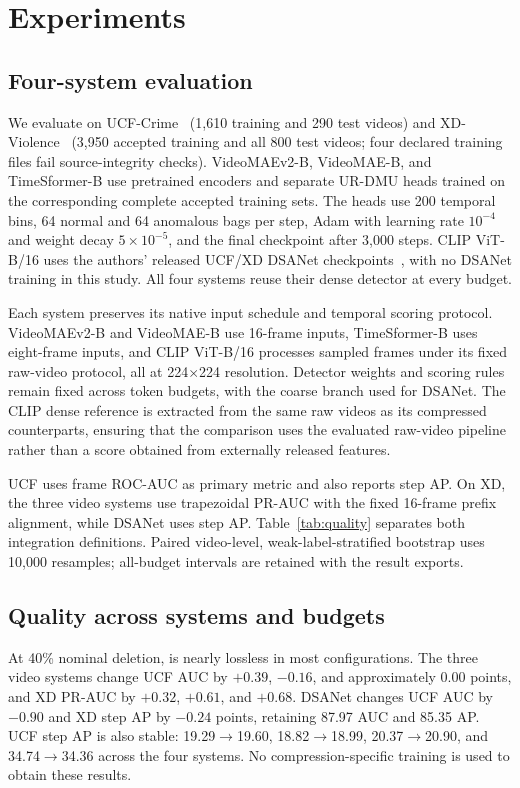 \section{Experiments}
\label{sec:experiments}

\subsection{Four-system evaluation}
We evaluate on UCF-Crime~\cite{sultani2018real} (1,610 training and 290 test videos) and XD-Violence~\cite{wu2020xd} (3,950 accepted training and all 800 test videos; four declared training files fail source-integrity checks). VideoMAEv2-B, VideoMAE-B, and TimeSformer-B use pretrained encoders and separate UR-DMU heads trained on the corresponding complete accepted training sets. The heads use 200 temporal bins, 64 normal and 64 anomalous bags per step, Adam with learning rate $10^{-4}$ and weight decay $5\!\times\!10^{-5}$, and the final checkpoint after 3,000 steps. CLIP ViT-B/16 uses the authors' released UCF/XD DSANet checkpoints~\cite{yin2026learning}, with no DSANet training in this study. All four systems reuse their dense detector at every budget.

Each system preserves its native input schedule and temporal scoring protocol. VideoMAEv2-B and VideoMAE-B use 16-frame inputs, TimeSformer-B uses eight-frame inputs, and CLIP ViT-B/16 processes sampled frames under its fixed raw-video protocol, all at 224$\times$224 resolution. Detector weights and scoring rules remain fixed across token budgets, with the coarse branch used for DSANet. The CLIP dense reference is extracted from the same raw videos as its compressed counterparts, ensuring that the comparison uses the evaluated raw-video pipeline rather than a score obtained from externally released features.

UCF uses frame ROC-AUC as primary metric and also reports step AP. On XD, the three video systems use trapezoidal PR-AUC with the fixed 16-frame prefix alignment, while DSANet uses step AP. Table~\ref{tab:quality} separates both integration definitions. Paired video-level, weak-label-stratified bootstrap uses 10,000 resamples; all-budget intervals are retained with the result exports.

\subsection{Quality across systems and budgets}
At 40\% nominal deletion, \method{} is nearly lossless in most configurations. The three video systems change UCF AUC by $+0.39$, $-0.16$, and approximately $0.00$ points, and XD PR-AUC by $+0.32$, $+0.61$, and $+0.68$. DSANet changes UCF AUC by $-0.90$ and XD step AP by $-0.24$ points, retaining 87.97 AUC and 85.35 AP. UCF step AP is also stable: 19.29$\to$19.60, 18.82$\to$18.99, 20.37$\to$20.90, and 34.74$\to$34.36 across the four systems. No compression-specific training is used to obtain these results.

